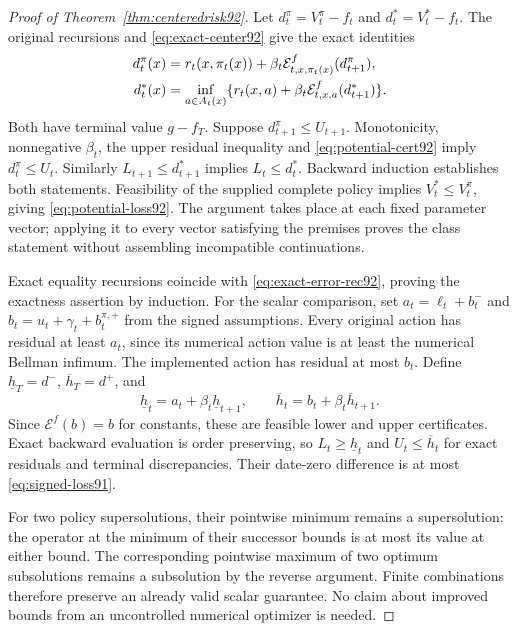 \begin{proof}[Proof of Theorem~\ref{thm:centeredrisk92}]
Let $d_t^\pi=V_t^\pi-f_t$ and $d_t^*=V_t^*-f_t$. The original recursions and \eqref{eq:exact-center92} give the exact identities
\begin{align}\label{eq:exact-error-rec92}
 d_t^\pi(x)&=r_t(x,\pi_t(x))+
            \beta_t\mathcal E_{t,x,\pi_t(x)}^f(d_{t+1}^\pi),\notag\\
 d_t^*(x)&=\inf_{a\in A_t(x)}
            \{r_t(x,a)+\beta_t\mathcal E_{t,x,a}^f(d_{t+1}^*)\}.
\end{align}
Both have terminal value $g-f_T$. Suppose $d_{t+1}^\pi\le U_{t+1}$. Monotonicity, nonnegative $\beta_t$, the upper residual inequality and \eqref{eq:potential-cert92} imply $d_t^\pi\le U_t$. Similarly $L_{t+1}\le d_{t+1}^*$ implies $L_t\le d_t^*$. Backward induction establishes both statements. Feasibility of the supplied complete policy implies $V_t^*\le V_t^\pi$, giving \eqref{eq:potential-loss92}. The argument takes place at each fixed parameter vector; applying it to every vector satisfying the premises proves the class statement without assembling incompatible continuations.

Exact equality recursions coincide with \eqref{eq:exact-error-rec92}, proving the exactness assertion by induction. For the scalar comparison, set $a_t=\ell_t+b_t^-$ and $b_t=u_t+\gamma_t+b_t^{\pi,+}$ from the signed assumptions. Every original action has residual at least $a_t$, since its numerical action value is at least the numerical Bellman infimum. The implemented action has residual at most $b_t$. Define $\underline h_T=d^-$, $\overline h_T=d^+$, and
\[
 \underline h_t=a_t+\beta_t\underline h_{t+1},\qquad
 \overline h_t=b_t+\beta_t\overline h_{t+1}.
\]
Since $\mathcal E^f(b)=b$ for constants, these are feasible lower and upper certificates. Exact backward evaluation is order preserving, so $L_t\ge\underline h_t$ and $U_t\le\overline h_t$ for exact residuals and terminal discrepancies. Their date-zero difference is at most \eqref{eq:signed-loss91}.

For two policy supersolutions, their pointwise minimum remains a supersolution: the operator at the minimum of their successor bounds is at most its value at either bound. The corresponding pointwise maximum of two optimum subsolutions remains a subsolution by the reverse argument. Finite combinations therefore preserve an already valid scalar guarantee. No claim about improved bounds from an uncontrolled numerical optimizer is needed.
\end{proof}

